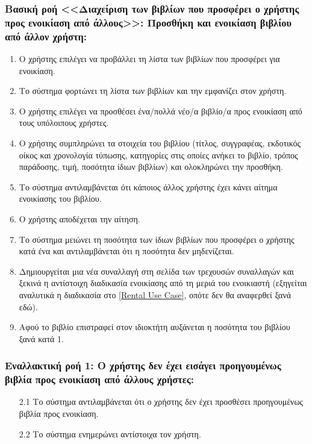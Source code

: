 \documentclass[12pt,a4paper]{article}
\begin{document}
\subsubsection*{Βασική ροή <<Διαχείριση των βιβλίων που προσφέρει ο χρήστης \\προς ενοικίαση από άλλους>>: Προσθήκη και ενοικίαση βιβλίου από άλλον χρήστη:}
\begin{enumerate}
    \item Ο χρήστης επιλέγει να προβάλλει τη λίστα των βιβλίων που προσφέρει για ενοικίαση.
    \item Το σύστημα φορτώνει τη λίστα των βιβλίων και την εμφανίζει στον χρήστη.
    \item Ο χρήστης επιλέγει να προσθέσει ένα/πολλά νέο/α βιβλίο/α προς ενοικίαση από τους υπόλοιπους χρήστες.
    \item Ο χρήστης συμπληρώνει τα στοιχεία του βιβλίου (τίτλος, συγγραφέας, εκδοτικός οίκος και χρονολογία τύπωσης, κατηγορίες στις οποίες ανήκει το βιβλίο, τρόπος παράδοσης, τιμή, ποσότητα ίδιων βιβλίων) και ολοκληρώνει την προσθήκη.
    \item Το σύστημα αντιλαμβάνεται ότι κάποιος άλλος χρήστης έχει κάνει αίτημα ενοικίασης του βιβλίου.
    \item Ο χρήστης αποδέχεται την αίτηση.
    \item Το σύστημα μειώνει τη ποσότητα των ίδιων βιβλίων που προσφέρει ο χρήστης κατά ένα και αντιλαμβάνεται ότι η ποσότητα δεν μηδενίζεται.
    \item Δημιουργείται μια νέα συναλλαγή στη σελίδα των τρεχουσών συναλλαγών και ξεκινά η αντίστοιχη διαδικασία ενοικίασης από τη μεριά του ενοικιαστή (εξηγείται αναλυτικά η διαδικασία στο \ref{Rental Use Case}, οπότε δεν θα αναφερθεί ξανά εδώ).
    \item Αφού το βιβλίο επιστραφεί στον ιδιοκτήτη αυξάνεται η ποσότητα του βιβλίου ξανά κατά 1.
\end{enumerate}

\subsubsection*{Εναλλακτική ροή 1: Ο χρήστης δεν έχει εισάγει προηγουμένως βιβλία προς ενοικίαση από άλλους χρήστες:}
\begin{enumerate}
    \item [2.1] Το σύστημα αντιλαμβάνεται ότι ο χρήστης δεν έχει προσθέσει προηγουμένως βιβλία προς ενοικίαση.
    \item [2.2] Το σύστημα ενημερώνει αντίστοιχα τον χρήστη.
\end{enumerate}
\end{document}
